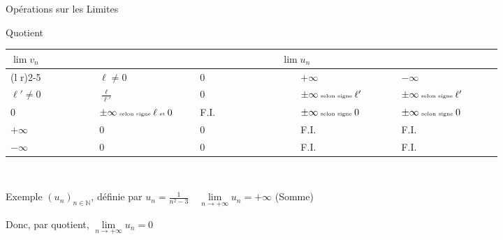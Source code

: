 \documentclass{cours}
\begin{document}
\begin{Gpartie}{Opérations sur les Limites}
\begin{Spartie}{Quotient}
\begin{center}
{\begin{tabular}{ p{0.15\linewidth} *{4}{M{0.17\linewidth} }}
                     &  \\ 
                    \cmidrule(l r){2-5}
                        & $\ell\neq0$ & $0$ & $+\infty$ & $-\infty$ \\ \midrule
                    $\ell'\neq 0$                                               & $\frac{\ell}{\ell'}$  & $0$ & $\pm\infty\text{\tiny{ selon signe }}\ell'$ & $\pm\infty\text{\tiny{ selon signe }}\ell'$ \\ 
                    $0$                                                           & $\pm\infty\text{\tiny{ selon signe }}\ell\text{\tiny{ et }}0$ & F.I. & $\pm\infty\text{\tiny{ selon signe }}0$ & $\pm\infty\text{\tiny{ selon signe }}0$ \\
                    $+\infty$                                                   & $0$ & $0$ & F.I. & F.I. \\ 
                    $-\infty$                                                   & $0$ & $0$ & F.I. & F.I. \\ \bottomrule
                \end{tabular}
                }
            \end{center}
            \parbox{\linewidth}{} 
            \\[2ex]
            \begin{SSpartie}{Exemple} 
                $(u_n)_{n\in\mathbb{N}}$, définie par $u_n=\frac{1}{n^2-3}\quad\lim\limits_{n\to +\infty}u_n=+\infty$ (Somme)

                Donc, par quotient, $\lim\limits_{n\to +\infty}u_n=0$
            \end{SSpartie}
        \end{Spartie}
    \end{Gpartie}
    \pagebreak
\end{document}
